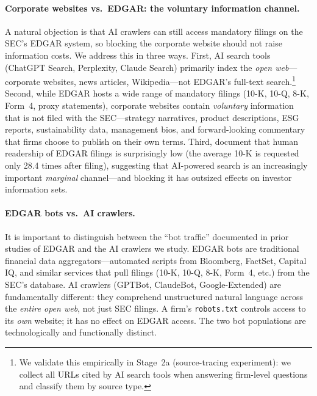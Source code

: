 \documentclass[12pt,a4paper]{article}
\begin{document}
\paragraph{Corporate websites vs.\ EDGAR: the voluntary information channel.} A natural objection is that AI crawlers can still access mandatory filings on the SEC's EDGAR system, so blocking the corporate website should not raise information costs. We address this in three ways. First, AI search tools (ChatGPT Search, Perplexity, Claude Search) primarily index the \emph{open web}---corporate websites, news articles, Wikipedia---not EDGAR's full-text search.\footnote{We validate this empirically in Stage~2a (source-tracing experiment): we collect all URLs cited by AI search tools when answering firm-level questions and classify them by source type.} Second, while EDGAR hosts a wide range of mandatory filings (10-K, 10-Q, 8-K, Form~4, proxy statements), corporate websites contain \emph{voluntary} information that is not filed with the SEC---strategy narratives, product descriptions, ESG reports, sustainability data, management bios, and forward-looking commentary that firms choose to publish on their own terms. Third, \citet{LoughranMcDonald2017} document that human readership of EDGAR filings is surprisingly low (the average 10-K is requested only 28.4 times after filing), suggesting that AI-powered search is an increasingly important \emph{marginal} channel---and blocking it has outsized effects on investor information sets.

\paragraph{EDGAR bots vs.\ AI crawlers.} It is important to distinguish between the ``bot traffic'' documented in prior studies of EDGAR \citep{LoughranMcDonald2017, ChenKellyWu2020} and the AI crawlers we study. EDGAR bots are traditional financial data aggregators---automated scripts from Bloomberg, FactSet, Capital IQ, and similar services that pull filings (10-K, 10-Q, 8-K, Form~4, etc.) from the SEC's database. AI crawlers (GPTBot, ClaudeBot, Google-Extended) are fundamentally different: they comprehend unstructured natural language across the \emph{entire open web}, not just SEC filings. A firm's \texttt{robots.txt} controls access to its \emph{own} website; it has no effect on EDGAR access. The two bot populations are technologically and functionally distinct.
\end{document}
